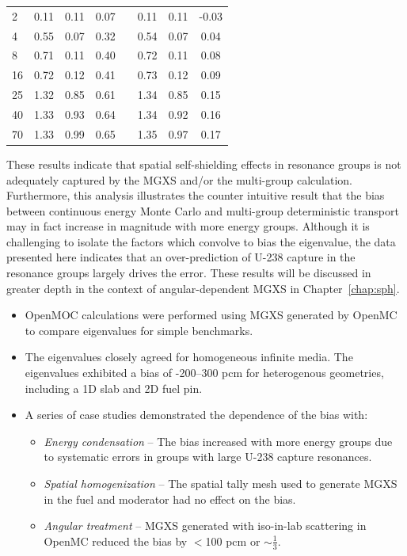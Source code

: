 {\begin{table}[H]
\begin{tabular}{a S[table-format=6.1] S[table-format=6.1] S[table-format=6.1] c S[table-format=6.1] S[table-format=6.1] S[table-format=6.1]}
2 & 0.11 & 0.11 & 0.07 & & 0.11 & 0.11 & -0.03 \\
4 & 0.55 & 0.07 & 0.32 & & 0.54 & 0.07 & 0.04 \\
8 & 0.71 & 0.11 & 0.40 & & 0.72 & 0.11 & 0.08 \\
16 & 0.72 & 0.12 & 0.41 & & 0.73 & 0.12 & 0.09 \\
25 & 1.32 & 0.85 & 0.61 & & 1.34 & 0.85 & 0.15 \\
40 & 1.33 & 0.93 & 0.64 & & 1.34 & 0.92 & 0.16 \\
70 & {} 1.33 & 0.99 & 0.65 & & 1.35 & 0.97 & 0.17 \\
  \bottomrule
\end{tabular}
\end{table}}

These results indicate that spatial self-shielding effects in resonance groups is not adequately captured by the \ac{MGXS} and/or the multi-group calculation. Furthermore, this analysis illustrates the counter intuitive result that the bias between continuous energy Monte Carlo and multi-group deterministic transport may in fact increase in magnitude with more energy groups. Although it is challenging to isolate the factors which convolve to bias the eigenvalue, the data presented here indicates that an over-prediction of U-238 capture in the resonance groups largely drives the error. These results will be discussed in greater depth in the context of angular-dependent \ac{MGXS} in Chapter~\ref{chap:sph}.

\vfill
\begin{highlightsbox}[frametitle=Highlights]
\begin{itemize}
  \item OpenMOC calculations were performed using \ac{MGXS} generated by OpenMC to compare eigenvalues for simple benchmarks.
  \item The eigenvalues closely agreed for homogeneous infinite media. The eigenvalues exhibited a bias of -200--300 \ac{pcm} for heterogenous geometries, including a 1D slab and 2D fuel pin.
  \item A series of case studies demonstrated the dependence of the bias with:
  \begin{itemize}
    \item \textit{Energy condensation} -- The bias increased with more energy groups due to systematic errors in groups with large U-238 capture resonances.
    \item \textit{Spatial homogenization} -- The spatial tally mesh used to generate \ac{MGXS} in the fuel and moderator had no effect on the bias.
    \item \textit{Angular treatment} -- \ac{MGXS} generated with iso-in-lab scattering in OpenMC reduced the bias by $<$100 \ac{pcm} or $\sim\frac{1}{3}$.
  \end{itemize} 
\end{itemize}
\end{highlightsbox}
\vfill
